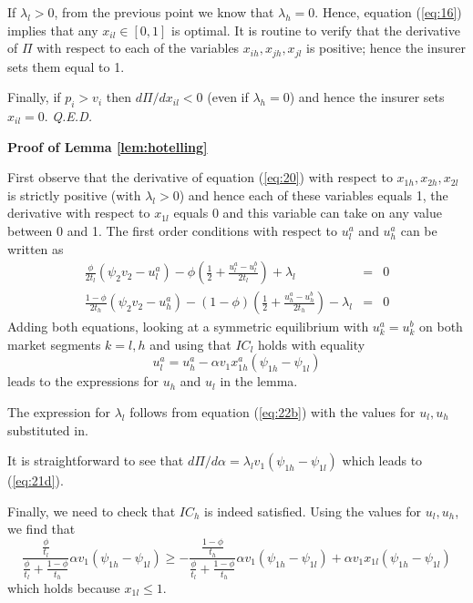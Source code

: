 \documentclass[12pt,english,a4paper]{article}
\newcommand{\qed}{\hspace*{\fill} {\em Q.E.D.}}
\begin{document}
If \(\lambda_l >0\), from the previous point we know that \(\lambda_h = 0\). Hence, equation (\ref{eq:16}) implies that any \(x_{il} \in [0,1]\) is optimal. It is routine to verify that the derivative of \(\Pi\) with respect to each of the variables \(x_{ih},x_{jh},x_{jl}\) is positive; hence the insurer sets them equal to 1.

Finally, if \(p_i > v_i\) then \(d\Pi/dx_{il} <0\) (even if \(\lambda_h =0\)) and hence the insurer sets \(x_{il}=0\).\qed


\textbf{Proof of Lemma \ref{lem:hotelling}}

First observe that the derivative of equation (\ref{eq:20}) with respect to \(x_{1h},x_{2h},x_{2l}\) is strictly positive (with \(\lambda_l >0\)) and hence each of these variables equals 1, the derivative with respect to \(x_{1l}\) equals 0 and this variable can take on any value between 0 and 1. The first order conditions with respect to \(u_l^a\) and \(u_h^a\) can be written as
\begin{eqnarray}
\label{eq:22}
\frac{\phi}{2t_l}(\psi_2 v_2 - u_l^a) - \phi(\frac{1}{2} + \frac{u_l^a-u_l^b}{2t_l}) + \lambda_{l}  &=&0 \\
\label{eq:22b}
\frac{1-\phi}{2t_h}(\psi_2 v_2 - u_h^a) - (1-\phi)(\frac{1}{2} + \frac{u_h^a-u_h^b}{2t_h}) - \lambda_{l}  &=&0
\end{eqnarray}
Adding both equations, looking at a symmetric equilibrium with \(u_k^a=u_k^b\) on both market segments \(k=l,h\)  and using that \(IC_l\) holds with equality
\begin{equation}
\label{eq:23}
u_l^a = u_h^a - \alpha v_1 x_{1h}^a (\psi_{1h}-\psi_{1l})
\end{equation}
leads to the expressions for \(u_h\) and \(u_l\) in the lemma.

The expression for \(\lambda_{l}\) follows from equation (\ref{eq:22b}) with the values for \(u_l,u_h\) substituted in.

It is straightforward to see that \(d\Pi/d\alpha = \lambda_{l} v_1 (\psi_{1h}-\psi_{1l})\) which leads to (\ref{eq:21d}).

Finally, we need to check that \(IC_h\) is indeed satisfied. Using the values for \(u_l,u_h\), we find that
\begin{equation}
\label{eq:24}
\frac{\frac{\phi}{t_l}}{\frac{\phi}{t_l}+\frac{1-\phi}{t_h}}\alpha v_1 (\psi_{1h}-\psi_{1l}) \geq -\frac{\frac{1-\phi}{t_h}}{\frac{\phi}{t_l}+\frac{1-\phi}{t_h}}\alpha v_1 (\psi_{1h}-\psi_{1l}) + \alpha v_1 x_{1l} (\psi_{1h}-\psi_{1l})
\end{equation}
which holds because \(x_{1l} \leq 1\).
\end{document}
